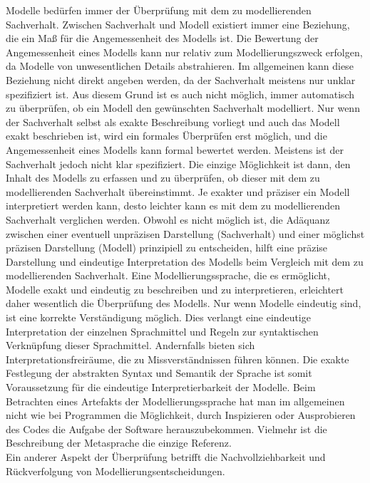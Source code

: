 Modelle bedürfen immer der Überprüfung mit dem zu modellierenden Sachverhalt. Zwischen Sachverhalt
und Modell existiert immer eine Beziehung, die ein Maß für die Angemessenheit des Modells ist.
Die Bewertung der Angemessenheit eines Modells kann nur relativ zum Modellierungszweck erfolgen,
da Modelle von unwesentlichen Details abstrahieren. Im allgemeinen kann diese Beziehung nicht
direkt angeben werden, da der Sachverhalt meistens nur unklar spezifiziert ist. Aus diesem Grund ist
es auch nicht möglich, immer automatisch zu überprüfen, ob ein Modell den gewünschten Sachverhalt
modelliert. Nur wenn der Sachverhalt selbst als exakte Beschreibung vorliegt und auch das Modell
exakt beschrieben ist, wird ein formales Überprüfen erst möglich, und die Angemessenheit eines
Modells kann formal bewertet werden. Meistens ist der Sachverhalt jedoch nicht klar spezifiziert.
Die einzige Möglichkeit ist dann, den Inhalt des Modells zu erfassen und zu überprüfen, ob dieser mit
dem zu modellierenden Sachverhalt übereinstimmt. Je exakter und präziser ein Modell interpretiert
werden kann, desto leichter kann es mit dem zu modellierenden Sachverhalt verglichen werden.
Obwohl es nicht möglich ist, die Adäquanz zwischen einer eventuell unpräzisen Darstellung (Sachverhalt)
und einer möglichst präzisen Darstellung (Modell) prinzipiell zu entscheiden, hilft eine präzise
Darstellung und eindeutige Interpretation des Modells beim Vergleich mit dem zu modellierenden
Sachverhalt. Eine Modellierungssprache, die es ermöglicht, Modelle exakt und eindeutig zu beschreiben
und zu interpretieren, erleichtert daher wesentlich die Überprüfung des Modells.
Nur wenn Modelle eindeutig sind, ist eine korrekte Verständigung möglich. Dies verlangt eine eindeutige
Interpretation der einzelnen Sprachmittel und Regeln zur syntaktischen Verknüpfung dieser
Sprachmittel. Andernfalls bieten sich Interpretationsfreiräume, die zu Missverständnissen führen können.
Die exakte Festlegung der abstrakten Syntax und Semantik der Sprache ist somit Voraussetzung
für die eindeutige Interpretierbarkeit der Modelle. Beim Betrachten eines Artefakts der Modellierungssprache
hat man im allgemeinen nicht wie bei Programmen die Möglichkeit, durch Inspizieren oder
Ausprobieren des Codes die Aufgabe der Software herauszubekommen. Vielmehr ist die Beschreibung
der Metasprache die einzige Referenz.\\
Ein anderer Aspekt der Überprüfung betrifft die Nachvollziehbarkeit und Rückverfolgung von Modellierungsentscheidungen.\\\cite{MT010}
